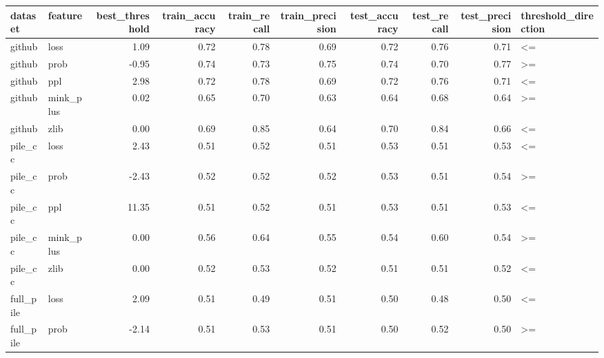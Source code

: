 \begin{tabular}{llrrrrrrrl}
\toprule
   dataset &   feature & best\_threshold & train\_accuracy & train\_recall & train\_precision & test\_accuracy & test\_recall & test\_precision & threshold\_direction \\
\midrule
    github &      loss &           1.09 &           0.72 &         0.78 &            0.69 &          0.72 &        0.76 &           0.71 &                  <= \\
    github &      prob &          -0.95 &           0.74 &         0.73 &            0.75 &          0.74 &        0.70 &           0.77 &                  >= \\
    github &       ppl &           2.98 &           0.72 &         0.78 &            0.69 &          0.72 &        0.76 &           0.71 &                  <= \\
    github & mink\_plus &           0.02 &           0.65 &         0.70 &            0.63 &          0.64 &        0.68 &           0.64 &                  >= \\
    github &      zlib &           0.00 &           0.69 &         0.85 &            0.64 &          0.70 &        0.84 &           0.66 &                  <= \\
   pile\_cc &      loss &           2.43 &           0.51 &         0.52 &            0.51 &          0.53 &        0.51 &           0.53 &                  <= \\
   pile\_cc &      prob &          -2.43 &           0.52 &         0.52 &            0.52 &          0.53 &        0.51 &           0.54 &                  >= \\
   pile\_cc &       ppl &          11.35 &           0.51 &         0.52 &            0.51 &          0.53 &        0.51 &           0.53 &                  <= \\
   pile\_cc & mink\_plus &           0.00 &           0.56 &         0.64 &            0.55 &          0.54 &        0.60 &           0.54 &                  >= \\
   pile\_cc &      zlib &           0.00 &           0.52 &         0.53 &            0.52 &          0.51 &        0.51 &           0.52 &                  <= \\
 full\_pile &      loss &           2.09 &           0.51 &         0.49 &            0.51 &          0.50 &        0.48 &           0.50 &                  <= \\
 full\_pile &      prob &          -2.14 &           0.51 &         0.53 &            0.51 &          0.50 &        0.52 &           0.50 &                  >= \\

\end{tabular}
